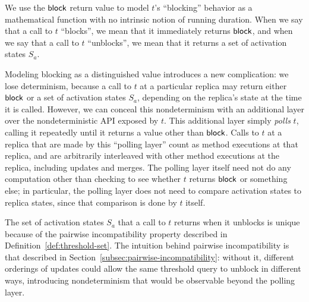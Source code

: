 We use the $\textsf{block}$ return value to model $t$'s ``blocking'' behavior
as a mathematical function with no intrinsic notion of running
duration.  When we say that a call to $t$ ``blocks'', we mean that it
immediately returns $\textsf{block}$, and when we say that a call to $t$
``unblocks'', we mean that it returns a set of activation states
$S_a$.

Modeling blocking as a distinguished value introduces a new
complication: we lose determinism, because a call to $t$ at a
particular replica may return either $\textsf{block}$ or a set of activation
states $S_a$, depending on the replica's state at the time it is
called.  However, we can conceal this nondeterminism with an
additional layer over the nondeterministic API exposed by $t$.  This
additional layer simply \emph{polls} $t$, calling it repeatedly until
it returns a value other than $\textsf{block}$.  Calls to $t$ at a replica
that are made by this ``polling layer'' count as method executions at
that replica, and are arbitrarily interleaved with other method
executions at the replica, including updates and merges.  The polling
layer itself need not do any computation other than checking to see
whether $t$ returns $\textsf{block}$ or something else; in particular, the
polling layer does not need to compare activation states to replica
states, since that comparison is done by $t$ itself.  

The set of activation states $S_a$ that a call to $t$ returns when it
unblocks is unique because of the pairwise incompatibility property
described in Definition~\ref{def:threshold-set}.  The intuition behind
pairwise incompatibility is that described in
Section~\ref{subsec:pairwise-incompatibility}: without it, different
orderings of updates could allow the same threshold query to unblock
in different ways, introducing nondeterminism that would be observable
beyond the polling layer.

